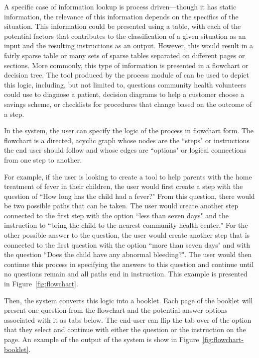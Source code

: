 \documentclass{sig-alternate}
\begin{document}
A specific case of information lookup is process driven---though it has static information, the relevance of this information depends on the specifics of the situation. This information could be presented using a table, with each of the potential factors that contributes to the classification of a given situation as an input and the resulting instructions as an output. However, this would result in a fairly sparse table or many sets of sparse tables separated on different pages or sections. More commonly, this type of information is presented in a flowchart or decision tree. The tool produced by the process module of \nifty can be used to depict this logic, including, but not limited to, questions community health volunteers could use to diagnose a patient, decision diagrams to help a customer choose a savings scheme, or checklists for procedures that change based on the outcome of a step. 

In the \nifty system, the user can specify the logic of the process in flowchart form. The flowchart is a directed, acyclic graph whose nodes are the ``steps" or instructions the end user should follow and whose edges are  ``options" or logical connections from one step to another.

For example, if the user is looking to create a tool to help parents with the home treatment of fever in their children, the user would first create a step with the question of ``How long has the child had a fever?" From this question, there would be two possible paths that can be taken. The user would create another step connected to the first step with the option ``less than seven days" and the instruction to ``bring the child to the nearest community health center." For the other possible answer to the question, the user would create another step that is connected to the first question with the option ``more than seven days" and with the question ``Does the child have any abnormal bleeding?". The user would then continue this process in specifying the answers to this question and continue until no questions remain and all paths end in instruction. This example is presented in Figure~\ref{fig:flowchart}.

Then, the system converts this logic into a booklet. Each page of the booklet will present one question from the flowchart and the potential answer options associated with it as tabs below. The end-user can flip the tab over of the option that they select and continue with either the question or the instruction on the page. An example of the output of the \nifty system is show in Figure~\ref{fig:flowchart-booklet}.
\end{document}
